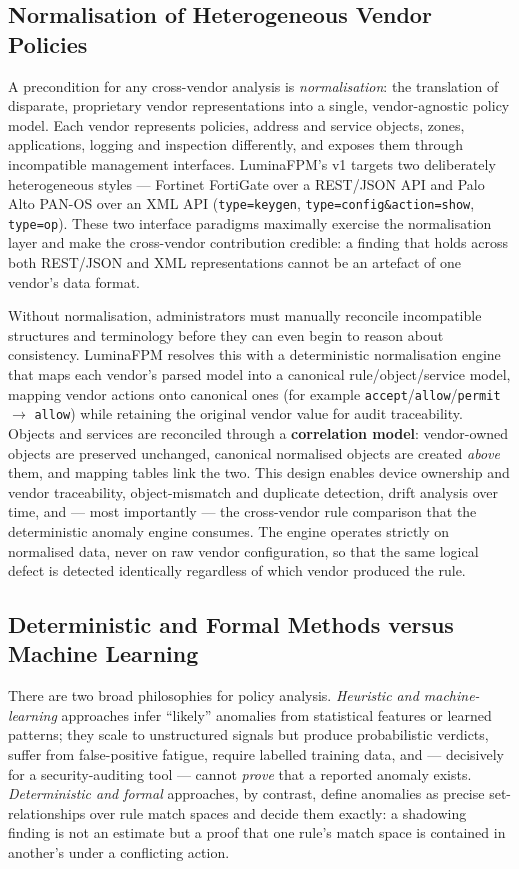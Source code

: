 \subsection{Normalisation of Heterogeneous Vendor Policies}
A precondition for any cross-vendor analysis is \emph{normalisation}: the translation of disparate, proprietary vendor representations into a single, vendor-agnostic policy model. Each vendor represents policies, address and service objects, zones, applications, logging and inspection differently, and exposes them through incompatible management interfaces. LuminaFPM's v1 targets two deliberately heterogeneous styles --- Fortinet FortiGate over a REST/JSON API and Palo Alto PAN-OS over an XML API (\texttt{type=keygen}, \texttt{type=config\&action=show}, \texttt{type=op}). These two interface paradigms maximally exercise the normalisation layer and make the cross-vendor contribution credible: a finding that holds across both REST/JSON and XML representations cannot be an artefact of one vendor's data format.

Without normalisation, administrators must manually reconcile incompatible structures and terminology before they can even begin to reason about consistency. LuminaFPM resolves this with a deterministic normalisation engine that maps each vendor's parsed model into a canonical rule/object/service model, mapping vendor actions onto canonical ones (for example \texttt{accept}/\texttt{allow}/\texttt{permit} $\rightarrow$ \texttt{allow}) while retaining the original vendor value for audit traceability. Objects and services are reconciled through a \textbf{correlation model}: vendor-owned objects are preserved unchanged, canonical normalised objects are created \emph{above} them, and mapping tables link the two. This design enables device ownership and vendor traceability, object-mismatch and duplicate detection, drift analysis over time, and --- most importantly --- the cross-vendor rule comparison that the deterministic anomaly engine consumes. The engine operates strictly on normalised data, never on raw vendor configuration, so that the same logical defect is detected identically regardless of which vendor produced the rule.

\subsection{Deterministic and Formal Methods versus Machine Learning}
There are two broad philosophies for policy analysis. \emph{Heuristic and machine-learning} approaches infer ``likely'' anomalies from statistical features or learned patterns; they scale to unstructured signals but produce probabilistic verdicts, suffer from false-positive fatigue, require labelled training data, and --- decisively for a security-auditing tool --- cannot \emph{prove} that a reported anomaly exists. \emph{Deterministic and formal} approaches, by contrast, define anomalies as precise set-relationships over rule match spaces and decide them exactly: a shadowing finding is not an estimate but a proof that one rule's match space is contained in another's under a conflicting action.

